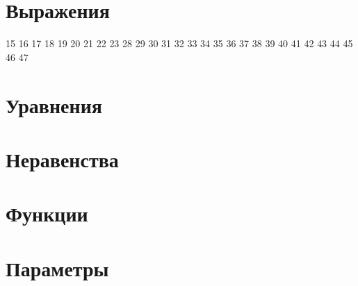 \section{Выражения}
	{15}
	{16}
	{17}
	{18}
	{19}
	{20}
	{21}
	{22}
	{23}
	{28}
	{29}
	{30}
	{31}
	{32}
	{33}
	{34}
	{35}
	{36}
	{37}
	{38}
	{39}
	{40}
	{41}
	{42}
	{43}
	{44}
	{45}
	{46}
	{47}
\section{Уравнения}
\section{Неравенства}
\section{Функции}
	
\section{Параметры}

